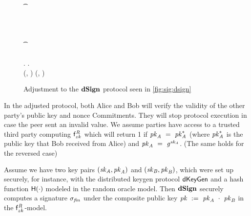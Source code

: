 \begin{figure}
\begin{center}
{\begin{varwidth}{\textwidth}
{            \pcif \procVerfPtSig{\varSigBob}{\varMsg}{\varPubKeyBob}  \< \< \\
            \t \pcreturn \cnstFalsum \< \< \\
            \varSigAlice \opFunResult \procSignPrt{\varMsg}{\varSecKeyAlice}{\varNonceAlice}{\varSigContext} \< \< \\
            \< \sendmessageright*{\varSigAlice} \< \\
            \< \< \pcif \procVerfPtSig{\varSigAlice}{\varMsg}{\varPubKeyAlice}  \\
            \< \< \t \pcreturn \cnstFalsum \\
            \varSigFin \opFunResult \procFinSig{\varSigAlice}{\varSigBob} \< \< \varSigFin \opFunResult \procFinSig{\varSigAlice}{\varSigBob} \\
            \varPubKey \opFunResult \varSigContext.\varPubKey \< \< \varPubKey \opFunResult \varSigContext.\varPubKey \\
            \pcreturn (\varSigFin, \varPubKey) \< \< \pcreturn (\varSigFin, \varPubKey)
            }
        \end{varwidth}
        }
    \end{center}
    \caption{Adjustment to the $\mathbf{dSign}$ protocol seen in \cref{fig:sig:dsign}} \label{fig:sig:dsign-adj}
\end{figure}


In the adjusted protocol, both Alice and Bob will verify the validity of the other party's public key and nonce Commitments.
They will stop protocol execution in case the peer sent an invalid value.
We assume parties have access to a trusted third party computing $\mathsf{f}^{\mathit{R}}_{zk}$ which will return 1 if $\mathit{pk}_{\mathit{A}} ~=~ \mathit{pk}_{\mathit{A}}^*$ (where $\mathit{pk}_{\mathit{A}}^*$ is the public key that Bob received from Alice) and $\mathit{pk}_{\mathit{A}} ~=~ \mathit{g}^{\mathit{sk}_{\mathit{A}}}$. (The same holds for the reversed case)

\begin{theorem}\label{lem:sig:dsign}
Assume we have two key pairs $(\mathit{sk}_{\mathit{A}}, \mathit{pk}_{\mathit{A}})$ and $(\mathit{sk}_{\mathit{B}}, \mathit{pk}_{\mathit{B}})$, which were set up securely, for instance, with the distributed keygen protocol $\mathsf{dKeyGen}$ and a hash function $\mathsf{H} (\cdot)$ modeled in the random oracle model.
    Then $\mathbf{dSign}$ securely computes a signature $\sigma_{\mathit{fin}}$ under the composite public key $\mathit{pk} ~:=~ \mathit{pk}_{\mathit{A}} ~\cdot~ \mathit{pk}_{\mathit{B}}$ in the $\mathsf{f}^{\mathit{R}}_{zk}$-model.
\end{theorem}

